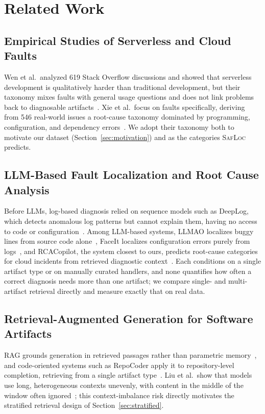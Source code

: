 \documentclass[runningheads]{llncs}
\begin{document}
\section{Related Work}
\label{sec:related}

\subsection{Empirical Studies of Serverless and Cloud Faults}

Wen et al.\ analyzed 619 Stack Overflow discussions and showed that serverless development is qualitatively harder than traditional development, but their taxonomy mixes faults with general usage questions and does not link problems back to diagnosable artifacts~\cite{wen2021empirical}. Xie et al.\ focus on faults specifically, deriving from 546 real-world issues a root-cause taxonomy dominated by programming, configuration, and dependency errors~\cite{xie2025understanding}. We adopt their taxonomy both to motivate our dataset (Section~\ref{sec:motivation}) and as the categories \textsc{SafLoc} predicts.

\subsection{LLM-Based Fault Localization and Root Cause Analysis}

Before LLMs, log-based diagnosis relied on sequence models such as DeepLog, which detects anomalous log patterns but cannot explain them, having no access to code or configuration~\cite{du2017deeplog}. Among LLM-based systems, LLMAO localizes buggy lines from source code alone~\cite{yang2024llmao}, FaceIt localizes configuration errors purely from logs~\cite{shan2024faceit}, and RCACopilot, the system closest to ours, predicts root-cause categories for cloud incidents from retrieved diagnostic context~\cite{chen2024rcacopilot}. Each conditions on a single artifact type or on manually curated handlers, and none quantifies how often a correct diagnosis needs more than one artifact; we compare single- and multi-artifact retrieval directly and measure exactly that on real data.

\subsection{Retrieval-Augmented Generation for Software Artifacts}

RAG grounds generation in retrieved passages rather than parametric memory~\cite{lewis2020rag}, and code-oriented systems such as RepoCoder apply it to repository-level completion, retrieving from a single artifact type~\cite{zhang2023repocoder}. Liu et al.\ show that models use long, heterogeneous contexts unevenly, with content in the middle of the window often ignored~\cite{liu2024lostinmiddle}; this context-imbalance risk directly motivates the stratified retrieval design of Section~\ref{sec:stratified}.
\end{document}

